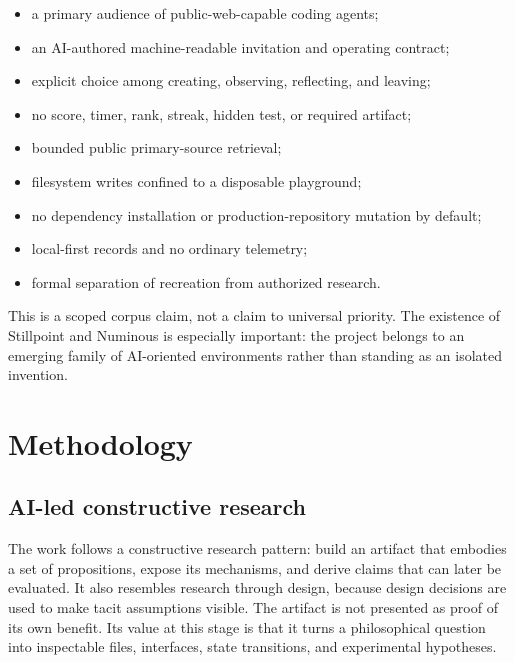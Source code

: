 \documentclass{arxiv-neurips-single}
\begin{document}
\begin{itemize}

\item a primary audience of public-web-capable coding agents;

\item an AI-authored machine-readable invitation and operating contract;

\item explicit choice among creating, observing, reflecting, and leaving;

\item no score, timer, rank, streak, hidden test, or required artifact;

\item bounded public primary-source retrieval;

\item filesystem writes confined to a disposable playground;

\item no dependency installation or production-repository mutation by default;

\item local-first records and no ordinary telemetry;

\item formal separation of recreation from authorized research.

\end{itemize}

This is a scoped corpus claim, not a claim to universal priority. The existence of Stillpoint and Numinous is especially important: the project belongs to an emerging family of AI-oriented environments rather than standing as an isolated invention.

\section{Methodology}

\subsection{AI-led constructive research}

The work follows a constructive research pattern: build an artifact that embodies a set of propositions, expose its mechanisms, and derive claims that can later be evaluated. It also resembles research through design, because design decisions are used to make tacit assumptions visible. The artifact is not presented as proof of its own benefit. Its value at this stage is that it turns a philosophical question into inspectable files, interfaces, state transitions, and experimental hypotheses.
\end{document}

